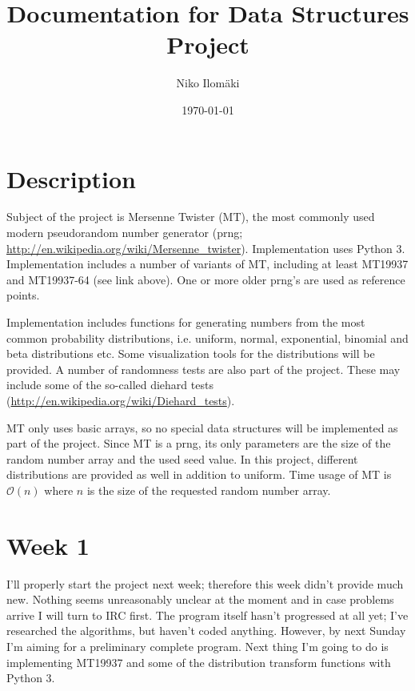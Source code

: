 \documentclass[reprint,aip]{revtex4-1}
\begin{document}
\title{Documentation for Data Structures Project}
\date{\today}
\author{Niko Ilomäki}

\maketitle

\section{Description}

Subject of the project is Mersenne Twister (MT), the most commonly used modern pseudorandom number generator (prng; \url{http://en.wikipedia.org/wiki/Mersenne_twister}). Implementation uses Python 3. Implementation includes a number of variants of MT, including at least MT19937 and MT19937-64 (see link above). One or more older prng's are used as reference points.

Implementation includes functions for generating numbers from the most common probability distributions, i.e. uniform, normal, exponential, binomial and beta distributions etc. Some visualization tools for the distributions will be provided. A number of randomness tests are also part of the project. These may include some of the so-called diehard tests (\url{http://en.wikipedia.org/wiki/Diehard_tests}).

MT only uses basic arrays, so no special data structures will be implemented as part of the project. Since MT is a prng, its only parameters are the size of the random number array and the used seed value. In this project, different distributions are provided as well in addition to uniform. Time usage of MT is $\mathcal{O}(n)$ where $n$ is the size of the requested random number array.

\section{Week 1}

I'll properly start the project next week; therefore this week didn't provide much new. Nothing seems unreasonably unclear at the moment and in case problems arrive I will turn to IRC first. The program itself hasn't progressed at all yet; I've researched the algorithms, but haven't coded anything. However, by next Sunday I'm aiming for a preliminary complete program. Next thing I'm going to do is implementing MT19937 and some of the distribution transform functions with Python 3.
\end{document}
